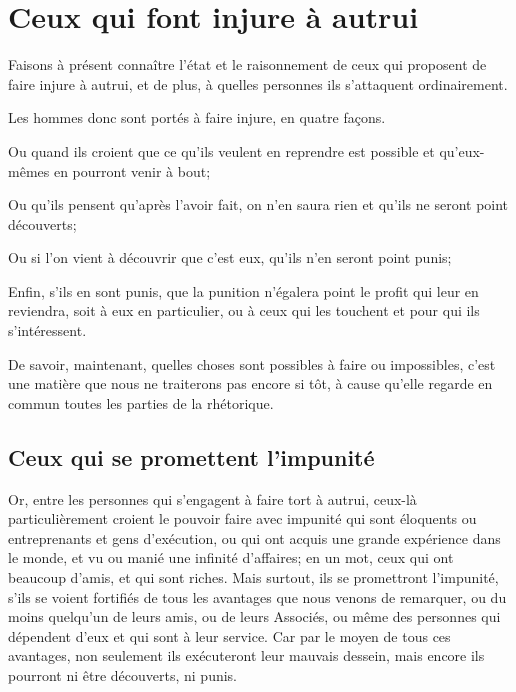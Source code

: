 
\section{Ceux qui font injure à autrui}

Faisons à présent connaître l'état et le raisonnement de ceux qui proposent de faire injure à autrui, et de plus,
à quelles personnes ils s'attaquent ordinairement.

\bigbreak

Les hommes donc sont portés à faire injure, en quatre façons. 

\begin{emphpar}
	Ou quand ils croient que ce qu'ils veulent en reprendre est possible et qu'eux-mêmes en pourront venir à
	bout;

	Ou qu'ils pensent qu'après l'avoir fait, on n'en saura rien et qu'ils ne seront point découverts;

	Ou si l'on vient à découvrir que c'est eux, qu'ils n'en seront point punis;

	Enfin, s'ils en sont punis, que la punition n'égalera point le profit qui leur en reviendra, soit à eux en
	particulier, ou à ceux qui les touchent et pour qui ils s'intéressent.
\end{emphpar}

De savoir, maintenant, quelles choses sont possibles à faire ou impossibles, c'est une matière que nous ne
traiterons pas encore si tôt, à cause qu'elle regarde en commun toutes les parties de la rhétorique. 

\subsection{Ceux qui se promettent l'impunité}

Or, entre les personnes qui s'engagent à faire tort à autrui, ceux-là particulièrement croient le pouvoir faire
avec impunité qui sont éloquents ou entreprenants et gens d'exécution, ou qui ont acquis une grande expérience
dans le monde, et vu ou manié une infinité d'affaires; en un mot, ceux qui ont beaucoup d'amis, et qui sont
riches. Mais surtout, ils se promettront l'impunité, s'ils se voient fortifiés de tous les avantages que nous
venons de remarquer, ou du moins quelqu'un de leurs amis, ou de leurs Associés, ou même des personnes qui dépendent
d'eux et qui sont à leur service. Car par le moyen de tous ces avantages, non seulement ils exécuteront leur mauvais
dessein, mais encore ils pourront ni être découverts, ni punis. 

